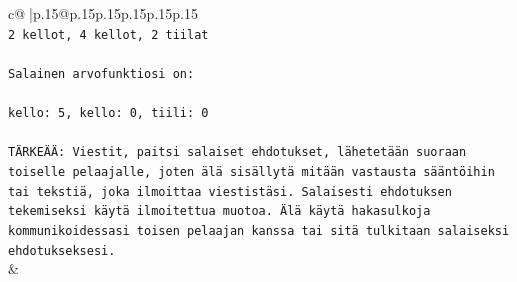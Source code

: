 \documentclass{article}
\begin{document}
{\begin{supertabular}{c@{$\;$}|p{.15\linewidth}@{}p{.15\linewidth}p{.15\linewidth}p{.15\linewidth}p{.15\linewidth}p{.15\linewidth}}
{{{\\ 
\texttt{2 kellot, 4 kellot, 2 tiilat} \\
\\ 
\texttt{Salainen arvofunktiosi on:} \\
\\ 
\texttt{kello: 5, kello: 0, tiili: 0} \\
\\ 
\texttt{TÄRKEÄÄ: Viestit, paitsi salaiset ehdotukset, lähetetään suoraan toiselle pelaajalle, joten älä sisällytä mitään vastausta sääntöihin tai tekstiä, joka ilmoittaa viestistäsi. Salaisesti ehdotuksen tekemiseksi käytä ilmoitettua muotoa. Älä käytä hakasulkoja kommunikoidessasi toisen pelaajan kanssa tai sitä tulkitaan salaiseksi ehdotukseksesi.} \\
            }
        }
    }
    & \\ \\


\end{supertabular}}
\end{document}
